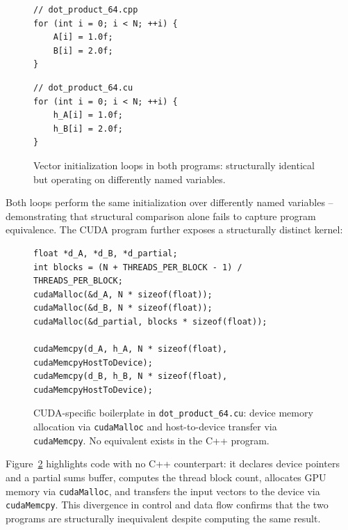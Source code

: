 \documentclass{article}
\begin{document}
\begin{figure}[H]
\noindent%
\begin{minipage}[t]{0.48\textwidth}
\begin{verbatim}
// dot_product_64.cpp
for (int i = 0; i < N; ++i) {
    A[i] = 1.0f;
    B[i] = 2.0f;
}
\end{verbatim}
\end{minipage}%
\hfill%
\begin{minipage}[t]{0.48\textwidth}
\begin{verbatim}
// dot_product_64.cu
for (int i = 0; i < N; ++i) {
    h_A[i] = 1.0f;
    h_B[i] = 2.0f;
}
\end{verbatim}
\end{minipage}
    \caption{Vector initialization loops in both programs: structurally identical but operating on differently named variables.}
    \label{fig:vector_init}
\end{figure}

Both loops perform the same initialization over differently named variables -- demonstrating that structural comparison alone fails to capture program equivalence. The CUDA program further exposes a structurally distinct kernel:

\begin{figure}[H]
\begin{verbatim}
float *d_A, *d_B, *d_partial;
int blocks = (N + THREADS_PER_BLOCK - 1) / THREADS_PER_BLOCK;
cudaMalloc(&d_A, N * sizeof(float));
cudaMalloc(&d_B, N * sizeof(float));
cudaMalloc(&d_partial, blocks * sizeof(float));

cudaMemcpy(d_A, h_A, N * sizeof(float), cudaMemcpyHostToDevice);
cudaMemcpy(d_B, h_B, N * sizeof(float), cudaMemcpyHostToDevice);
\end{verbatim}
    \caption{CUDA-specific boilerplate in \texttt{dot\_product\_64.cu}: device memory allocation via \texttt{cudaMalloc} and host-to-device transfer via \texttt{cudaMemcpy}. No equivalent exists in the C++ program.}
    \label{fig:cuda_boilerplate}
\end{figure}

Figure~\ref{fig:cuda_boilerplate} highlights code with no C++ counterpart: it declares device pointers and a partial sums buffer, computes the thread block count, allocates GPU memory via \texttt{cudaMalloc}, and transfers the input vectors to the device via \texttt{cudaMemcpy}. This divergence in control and data flow confirms that the two programs are structurally inequivalent despite computing the same result.
\end{document}
